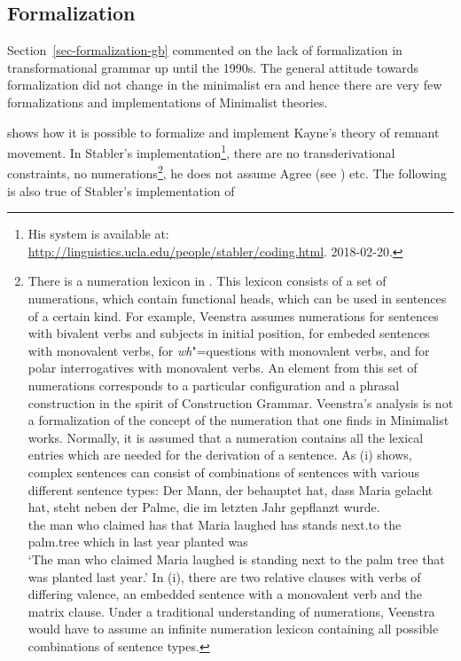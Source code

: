 \subsection{Formalization}
\label{sec-formalization-minimalism}

\addlines[2]
Section~\ref{sec-formalization-gb} commented on the lack of formalization in transformational
grammar up until the 1990s. The general attitude towards formalization did not change in the
minimalist era and hence there are very few formalizations and implementations of Minimalist theories.

\citet{Stabler2001a} shows how it is possible to formalize and implement Kayne's theory of remnant movement. In
Stabler's implementation\footnote{%
	His system is available at:
\url{http://linguistics.ucla.edu/people/stabler/coding.html}. 2018-02-20.
}, there are no transderivational constraints, no numerations\footnote{%
	There is a numeration lexicon in \citet[Chapter~9]{Veenstra98a}. This lexicon consists of a set of numerations, which contain functional
	heads, which can be used in sentences of a certain kind. For example, Veenstra assumes numerations for sentences with bivalent verbs
	and subjects in initial position, for embeded sentences with monovalent verbs, for \emph{wh}"=questions with monovalent verbs, and
	for polar interrogatives with monovalent verbs. An element from this set of numerations corresponds to a particular configuration and a
	phrasal construction in the spirit of Construction Grammar\indexcxg. Veenstra's analysis is not a formalization of the concept of the numeration
	that one finds in Minimalist works. Normally, it is assumed that a numeration contains all the lexical entries which are needed for the derivation
	of a sentence. As (i) shows, complex sentences can consist of combinations of sentences with
        various different sentence types: 
\ea
\gll Der Mann, der behauptet hat, dass Maria gelacht hat, steht neben der Palme, die im letzten Jahr gepflanzt wurde.\\
     the man who claimed has that Maria laughed has stands next.to the palm.tree which in last year planted was\\
\glt `The man who claimed Maria laughed is standing next to the palm tree that was planted last year.'
\z
In (i), there are two relative clauses with verbs of differing valence, an embedded sentence with a monovalent verb and the matrix clause.
Under a traditional understanding of numerations, Veenstra would have to assume an infinite numeration lexicon containing all possible
combinations of sentence types.
}, he does not assume Agree (see \citealp[]{Fong2014a}) etc. The following is also true of Stabler's implementation of 
